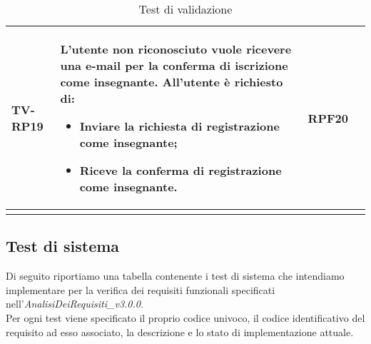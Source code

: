 \begin{longtable}{|>{\centering\arraybackslash}m{1.6cm}|>{\centering\arraybackslash}m{6.41cm}|>{\centering\arraybackslash}m{3.1cm} | >{\centering\arraybackslash}m{2.6cm}|}
		  \rowcolor{LightGray}
TV-RP19 & L’utente non riconosciuto vuole ricevere una e-mail per la conferma di iscrizione come insegnante. All'utente è richiesto di:

\begin{itemize}
 \item Inviare la richiesta di registrazione come insegnante;
 \item Riceve la conferma di registrazione come insegnante.
\end{itemize}  & RPF20 \\ \hline

		\caption{Test di validazione}
\end{longtable}

\subsection{Test di sistema}
Di seguito riportiamo una tabella contenente i test di sistema che intendiamo implementare per la verifica dei requisiti funzionali specificati nell'\textit{AnalisiDeiRequisiti\_v3.0.0}. \\
Per ogni test viene specificato il proprio codice univoco, il codice identificativo del requisito ad esso associato, la descrizione e lo stato di implementazione attuale.
